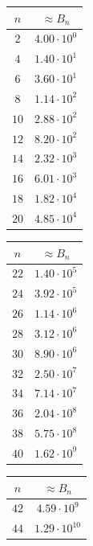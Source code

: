 \documentclass[11pt]{llncs}
\begin{document}
\begin{table}
	\centering
	\begin{minipage}{0.24\textwidth}
		\centering
		\begin{tabular}{|c|c|}
			\hline
			$n$ & $\approx B_n$ \\
			\hline
			$2$  & $4.00 \cdot 10^{0}$  \\
			$4$  & $1.40 \cdot 10^{1}$  \\
			$6$  & $3.60 \cdot 10^{1}$  \\
			$8$  & $1.14 \cdot 10^{2}$  \\
			$10$ & $2.88 \cdot 10^{2}$  \\
			$12$ & $8.20 \cdot 10^{2}$  \\
			$14$ & $2.32 \cdot 10^{3}$  \\
			$16$ & $6.01 \cdot 10^{3}$  \\
			$18$ & $1.82 \cdot 10^{4}$  \\
			$20$ & $4.85 \cdot 10^{4}$  \\
			\hline
		\end{tabular}
	\end{minipage}%
	\begin{minipage}{0.24\textwidth}
		\centering
		\begin{tabular}{|c|c|}
			\hline
			$n$ & $\approx B_n$ \\
			\hline
			$22$ & $1.40 \cdot 10^{5}$  \\
			$24$ & $3.92 \cdot 10^{5}$  \\
			$26$ & $1.14 \cdot 10^{6}$  \\
			$28$ & $3.12 \cdot 10^{6}$  \\
			$30$ & $8.90 \cdot 10^{6}$  \\
			$32$ & $2.50 \cdot 10^{7}$  \\
			$34$ & $7.14 \cdot 10^{7}$  \\
			$36$ & $2.04 \cdot 10^{8}$  \\
			$38$ & $5.75 \cdot 10^{8}$  \\
			$40$ & $1.62 \cdot 10^{9}$  \\
			\hline
		\end{tabular}
	\end{minipage}%
	\begin{minipage}{0.24\textwidth}
		\centering
		\begin{tabular}{|c|c|}
			\hline
			$n$ & $\approx B_n$ \\
			\hline
			$42$ & $4.59 \cdot 10^{9}$  \\
			$44$ & $1.29 \cdot 10^{10}$ \\

\end{tabular}
\end{minipage}
\end{table}
\end{document}
